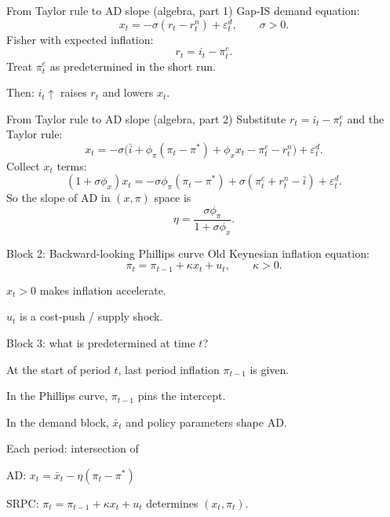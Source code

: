 \documentclass[aspectratio=169,xcolor=dvipsnames]{beamer}
\let\tempone\itemize
\let\temptwo\enditemize
\renewenvironment{itemize}{\tempone\addtolength{\itemsep}{\fill}}{\temptwo}
\begin{document}
\begin{frame}{From Taylor rule to AD slope (algebra, part 1)}
\small
Gap-IS demand equation:
\[
x_t = -\sigma(r_t-r_t^n) + \varepsilon_t^d,
\qquad \sigma>0.
\]
Fisher with expected inflation:
\[
r_t = i_t - \pi_t^{e}.
\]
Treat $\pi_t^e$ as predetermined in the short run.
\begin{itemize}
\item Then: $i_t\uparrow$ raises $r_t$ and lowers $x_t$.
\end{itemize}
\end{frame}

\begin{frame}{From Taylor rule to AD slope (algebra, part 2)}
\small
Substitute $r_t=i_t-\pi_t^e$ and the Taylor rule:
\[
x_t = -\sigma\big(\bar i + \phi_\pi(\pi_t-\pi^\ast) + \phi_x x_t - \pi_t^e - r_t^n\big) + \varepsilon_t^d.
\]
Collect $x_t$ terms:
\[
(1+\sigma\phi_x)x_t = -\sigma\phi_\pi(\pi_t-\pi^\ast) + \sigma(\pi_t^e + r_t^n -\bar i) + \varepsilon_t^d.
\]
So the slope of AD in $(x,\pi)$ space is
\[
\eta = \frac{\sigma\phi_\pi}{1+\sigma\phi_x}.
\]
\end{frame}

\begin{frame}{Block 2: Backward-looking Phillips curve}
\small
Old Keynesian inflation equation:
\[
\pi_t = \pi_{t-1} + \kappa x_t + u_t,
\qquad \kappa>0.
\]
\begin{itemize}
\item $x_t>0$ makes inflation accelerate.
\item $u_t$ is a cost-push / supply shock.
\end{itemize}
\end{frame}

\begin{frame}{Block 3: what is predetermined at time $t$?}
\begin{itemize}
\item At the start of period $t$, last period inflation $\pi_{t-1}$ is given.
\item In the Phillips curve, $\pi_{t-1}$ pins the intercept.
\item In the demand block, $\bar x_t$ and policy parameters shape AD.
\end{itemize}

\begin{itemize}
\item Each period: intersection of
\begin{itemize}
\item AD: $x_t = \bar x_t - \eta(\pi_t-\pi^\ast)$
\item SRPC: $\pi_t = \pi_{t-1} + \kappa x_t + u_t$
\end{itemize}
determines $(x_t,\pi_t)$.
\end{itemize}
\end{frame}
\end{document}
